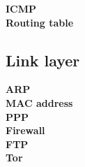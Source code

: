     \textbf{ICMP} \\
    
   \textbf{Routing table} \\
   
    
    
    \subsection{Link layer}
    \textbf{ARP} \\
    
    \textbf{MAC address} \\
    
    \textbf{PPP} \\
    





\textbf{Firewall} \\

\textbf{FTP} \\


\textbf{Tor} \\





\newpage

